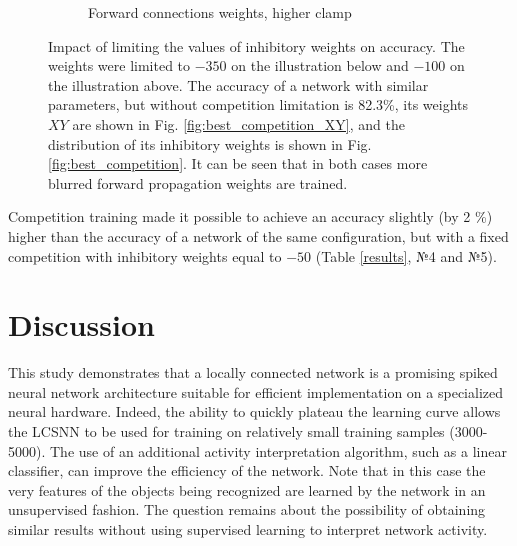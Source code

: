 \documentclass[a4paper]{article}
\begin{document}
\begin{figure}
\begin{subfigure}{0.45\textwidth}
    \caption{Forward connections weights, higher clamp}
\end{subfigure} 
\caption{Impact of limiting the values of inhibitory weights on accuracy. The weights were limited to $ -350 $ on the illustration below and $ -100 $ on the illustration above. The accuracy of a network with similar parameters, but without competition limitation is 82.3\%, its weights $ XY $ are shown in Fig. \ref {fig:best_competition_XY}, and the distribution of its inhibitory weights is shown in Fig. \ref{fig:best_competition}. It can be seen that in both cases more blurred forward propagation weights are trained.
}
\label{fig:compe_clamp}
\end{figure}

Competition training made it possible to achieve an accuracy slightly (by 2 \%) higher than the accuracy of a network of the same configuration, but with a fixed competition with inhibitory weights equal to $ -50 $ (Table \ref{results}, №4 and №5).

\section{Discussion}
This study demonstrates that a locally connected network is a promising spiked neural network architecture suitable for efficient implementation on a specialized neural hardware. Indeed, the ability to quickly plateau the learning curve allows the LCSNN to be used for training on relatively small training samples (3000-5000). The use of an additional activity interpretation algorithm, such as a linear classifier, can improve the efficiency of the network. Note that in this case the very features of the objects being recognized are learned by the network in an unsupervised fashion. The question remains about the possibility of obtaining similar results without using supervised learning to interpret network activity.
\end{document}
